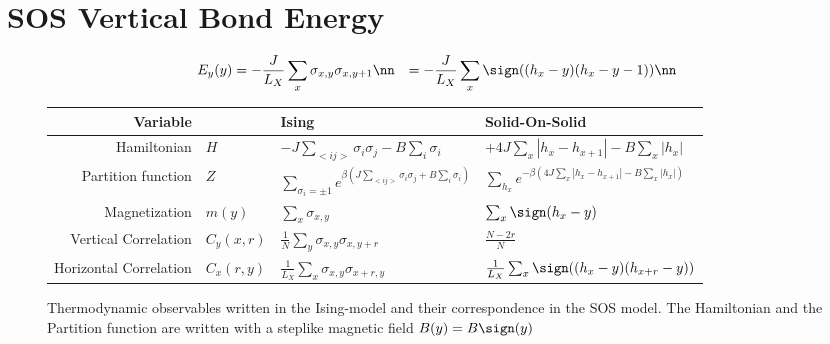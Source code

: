 \section{SOS Vertical Bond Energy}

\begin{align*}
    E_y(y) &= - \frac{J}{L_X} \sum_x \sigma_{x,y} \sigma_{x,y+1} \nn
    &= - \frac{J}{L_X} \sum_x \sign((h_x-y)(h_x -y-1)) \nn
\end{align*}

\begin{figure}[h]
  \begin{tabular}{|rl|l|l|}
  \hline
  \textbf{Variable} & & \textbf{Ising} & \textbf{Solid-On-Solid} 
  \rule[-2.5ex]{0pt}{7ex}\\ \hline
      Hamiltonian &$H$ & $- J \sum_{<ij>} \sigma_i \sigma_j - B \sum_i \sigma_i$ & $+4J \sum_x |h_x-h_{x+1}| - B \sum_x |h_x|$
  \rule[-2.5ex]{0pt}{7ex}\\ \hline
      Partition function &$Z$ & $\sum_{\sigma_i = \pm 1} e^{ \beta (J \sum_{<ij>} \sigma_i \sigma_j + B \sum_i \sigma_i )}$ & $\sum_{h_x} e^{-\beta ( 4J \sum_x |h_x-h_{x+1}| - B \sum_x |h_x|)}$
  \rule[-2.5ex]{0pt}{7ex}\\ \hline
      Magnetization &$m(y)$ &  $\sum_x \sigma_{x,y}$ & $\sum_x \sign(h_x-y)$
  \rule[-2.5ex]{0pt}{7ex}\\ \hline
      Vertical Correlation  &$C_y(x,r)$  & $\frac{1}{N} \sum_y \sigma_{x,y} \sigma_{x,y+r}$ & $\frac{N - 2r}{N}$
  \rule[-2.5ex]{0pt}{7ex}\\ \hline
      Horizontal Correlation  &$C_x(r,y)$ & $\frac{1}{L_X} \sum_{x} \sigma_{x,y} \sigma_{x+r,y}$ & $\frac{1}{L_X} \sum_x \sign( (h_x -y)(h_{x+r} -y))$
  \rule[-2.5ex]{0pt}{7ex}\\ \hline
  \end{tabular}
  \caption{Thermodynamic observables written in the Ising-model and their correspondence in the SOS model. The Hamiltonian and the Partition function are written with a steplike magnetic field $B(y) = B \sign(y)$}
  \label{ising-to-sos}
\end{figure}
